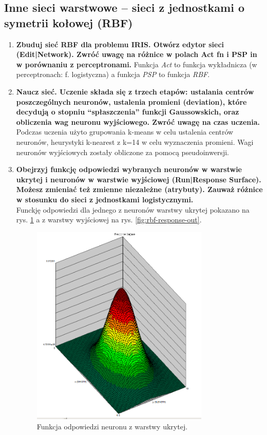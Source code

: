 \subsection{Inne sieci warstwowe – sieci z jednostkami o symetrii kołowej (RBF)}
\begin{enumerate}
\item \textbf{Zbuduj sieć RBF dla problemu IRIS.
Otwórz edytor sieci (Edit|Network). Zwróć uwagę na różnice w polach Act fn i PSP in w porównaniu z perceptronami.}
Funkcja \textit{Act} to funkcja wykładnicza (w perceptronach: f. logistyczna) a funkcja \textit{PSP} to funkcja \textit{RBF}.  

\item \textbf{
Naucz sieć. Uczenie składa się z trzech etapów: ustalania centrów poszczególnych neuronów, ustalenia promieni (deviation), które decydują o stopniu “spłaszczenia” funkcji Gaussowskich, oraz obliczenia wag neuronu wyjściowego. Zwróć uwagę na czas uczenia.}
\\Podczas uczenia użyto grupowania k-means w celu ustalenia centrów neuronów, heurystyki k-nearest z k=14 w celu wyznaczenia promieni. Wagi neuronów wyjściowych zostały obliczone za pomocą pseudoinwersji.

\item \textbf{
Obejrzyj funkcję odpowiedzi wybranych neuronów w warstwie ukrytej i neuronów w warstwie wyjściowej (Run|Response Surface). Możesz zmieniać też zmienne niezależne (atrybuty). Zauważ różnice w stosunku do sieci z jednostkami logistycznymi.}
\\Funckję odpowiedzi dla jednego z neuronów warstwy ukrytej pokazano na rys. \ref{fig:rbf-response-hidden} a z warstwy wyjściowej na rys. \ref{fig:rbf-response-out}.
\begin{figure}[h]
\centering
\includegraphics[width=0.8\textwidth]{dane/part1/zad11/rbf-response-hidden}
\caption{Funkcja odpowiedzi neuronu z warstwy ukrytej.\label{fig:rbf-response-hidden}}
\end{figure}


\end{enumerate}
